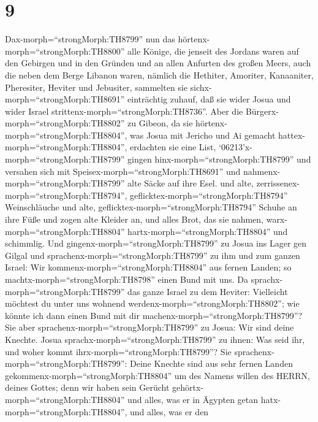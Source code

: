 \hypertarget{section-8}{%
\section{9}\label{section-8}}

 Dax-morph=``strongMorph:TH8799'' nun das
hörtenx-morph=``strongMorph:TH8800'' alle Könige, die jenseit des
Jordans waren auf den Gebirgen und in den Gründen und an allen Anfurten
des großen Meers, auch die neben dem Berge Libanon waren, nämlich die
Hethiter, Amoriter, Kanaaniter, Pheresiter, Heviter und Jebusiter,
 sammelten sie sichx-morph=``strongMorph:TH8691''
einträchtig zuhauf, daß sie wider Josua und wider Israel
strittenx-morph=``strongMorph:TH8736''.  Aber die
Bürgerx-morph=``strongMorph:TH8802'' zu Gibeon, da sie
hörtenx-morph=``strongMorph:TH8804'', was Josua mit Jericho und Ai
gemacht hattex-morph=``strongMorph:TH8804'', erdachten sie eine List,
 `06213'\textbar x-morph=``strongMorph:TH8799'' gingen
hinx-morph=``strongMorph:TH8799'' und versahen sich mit
Speisex-morph=``strongMorph:TH8691'' und
nahmenx-morph=``strongMorph:TH8799'' alte Säcke auf ihre Esel.
 und alte, zerrissenex-morph=``strongMorph:TH8794'',
geflicktex-morph=``strongMorph:TH8794'' Weinschläuche und alte,
geflicktex-morph=``strongMorph:TH8794'' Schuhe an ihre Füße und zogen
alte Kleider an, und alles Brot, das sie nahmen,
warx-morph=``strongMorph:TH8804'' hartx-morph=``strongMorph:TH8804'' und
schimmlig.  Und gingenx-morph=``strongMorph:TH8799'' zu
Josua ins Lager gen Gilgal und sprachenx-morph=``strongMorph:TH8799'' zu
ihm und zum ganzen Israel: Wir kommenx-morph=``strongMorph:TH8804'' aus
fernen Landen; so machtx-morph=``strongMorph:TH8798'' einen Bund mit
uns.  Da sprachx-morph=``strongMorph:TH8799'' das ganze
Israel zu dem Heviter: Vielleicht möchtest du unter uns wohnend
werdenx-morph=``strongMorph:TH8802''; wie könnte ich dann einen Bund mit
dir machenx-morph=``strongMorph:TH8799''?  Sie aber
sprachenx-morph=``strongMorph:TH8799'' zu Josua: Wir sind deine Knechte.
Josua sprachx-morph=``strongMorph:TH8799'' zu ihnen: Was seid ihr, und
woher kommt ihrx-morph=``strongMorph:TH8799''?  Sie
sprachenx-morph=``strongMorph:TH8799'': Deine Knechte sind aus sehr
fernen Landen gekommenx-morph=``strongMorph:TH8804'' um des Namens
willen des HERRN, deines Gottes; denn wir haben sein Gerücht
gehörtx-morph=``strongMorph:TH8804'' und alles, was er in Ägypten getan
hatx-morph=``strongMorph:TH8804'',  und alles, was er den
